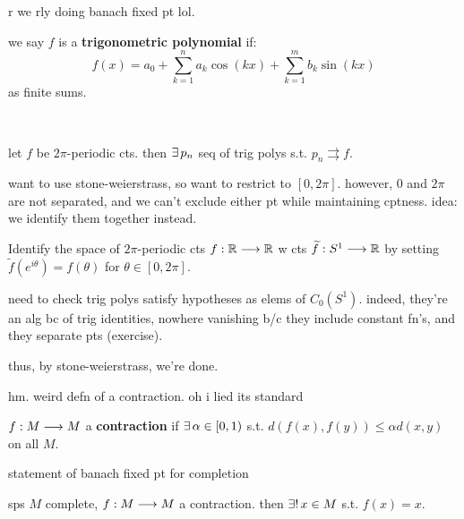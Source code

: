 r we rly doing banach fixed pt lol.

\begin{defn}
	we say $f$ is a \textbf{trigonometric polynomial} if:
	\begin{equation*}
		f(x)=a_{0}+\sum_{k=1}^{n}a_{k}\cos(kx)+\sum_{k=1}^{m}b_{k}\sin(kx)
	\end{equation*}
	as finite sums.
\end{defn} \

\begin{thm}
	let $f$ be $2\pi$-periodic cts.
	then $\ex p_{n}$ seq of trig polys s.t. $p_{n}\rightrightarrows f$.
\end{thm}
want to use stone-weierstrass, so want to restrict to $[0,2\pi]$.
however, 0 and $2\pi$ are not separated, and we can't exclude either pt while
maintaining cptness. idea: we identify them together instead.

\newpage
\begin{pf}[source=Primary Source Material]
	Identify the space of $2\pi$-periodic cts $f:\mathbb{R}\longrightarrow\mathbb{R}$ w cts
	$\widetilde{f}:S^{1}\longrightarrow\mathbb{R}$ by setting $\tilde{f}(e^{i\theta})=f(\theta)$ for $\theta\in[0,2\pi]$.

	need to check trig polys satisfy hypotheses as elems of $C_{0}(S^{1})$.
	indeed, they're an alg bc of trig identities, nowhere vanishing b/c they
	include constant fn's, and they separate pts (exercise).

	thus, by stone-weierstrass, we're done.
\end{pf}

hm. weird defn of a contraction. oh i lied its standard
\begin{defn}
	$f:M\longrightarrow M$ a \textbf{contraction} if $\ex\alpha\in[0,1)$ s.t.
	$d(f(x),f(y))\leq\alpha d(x,y)$ on all $M$.
\end{defn}

statement of banach fixed pt for completion
\begin{thm}[title=Banach Fixed-Point Theorem]
	sps $M$ complete, $f:M\longrightarrow M$ a contraction.
	then $\uex x\in M$ s.t. $f(x)=x$.
\end{thm} \

